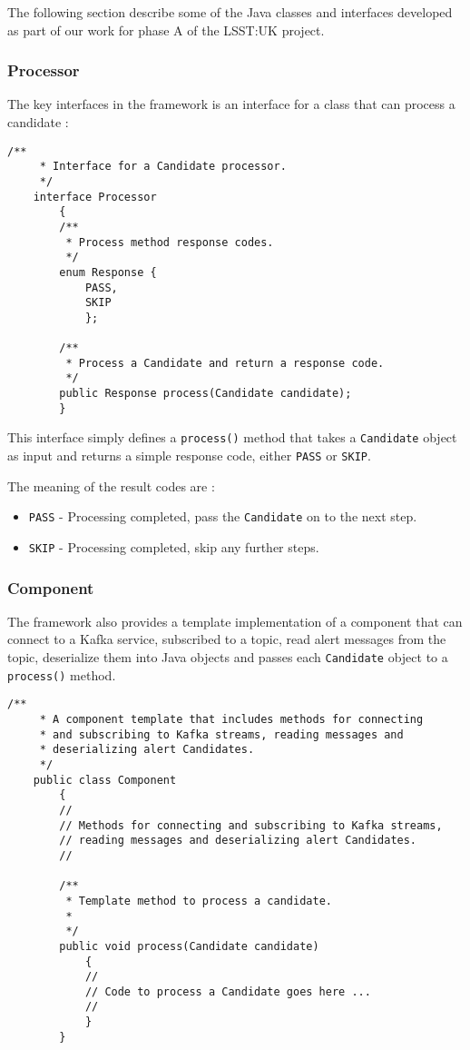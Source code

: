 \documentclass{article}
\newcommand{\deserz}    {deserialize\xspace}
\newcommand{\phasea} {phase A\xspace}
\newcommand{\lsstuk} {LSST:UK\xspace}
\begin{document}
The following section describe some of the Java classes and interfaces developed as part of our work for \phasea of the \lsstuk project. 

\subsubsection{Processor}
\label{java-interfaces.Processor}

The key interfaces in the framework is an interface for a class that can process a candidate :

\begin{lstlisting}[style=Java]
    /**
     * Interface for a Candidate processor.
     */
    interface Processor
        {
        /**
         * Process method response codes.
         */
        enum Response {
            PASS,
            SKIP
            };

        /**
         * Process a Candidate and return a response code.
         */
        public Response process(Candidate candidate);
        }
\end{lstlisting}

This interface simply defines a \texttt{process()} method that takes a \texttt{Candidate} object as input and
returns a simple response code, either \texttt{PASS} or \texttt{SKIP}.

The meaning of the result codes are :
\begin{itemize}
  \item \texttt{PASS} - Processing completed, pass the \texttt{Candidate} on to the next step.
  \item \texttt{SKIP} - Processing completed, skip any further steps.
\end{itemize}

\subsubsection{Component}
\label{java-interfaces.Component}

The framework also provides a template implementation of a component that can connect to a Kafka service, subscribed to a topic, read alert messages from the topic, \deserz them into Java objects and passes each \texttt{Candidate} object to a \texttt{process()} method.

\begin{lstlisting}[style=Java]
    /**
     * A component template that includes methods for connecting
     * and subscribing to Kafka streams, reading messages and
     * deserializing alert Candidates.
     */
    public class Component
        {
        //
        // Methods for connecting and subscribing to Kafka streams,
        // reading messages and deserializing alert Candidates.
        //

        /**
         * Template method to process a candidate.
         *
         */
        public void process(Candidate candidate)
            {
            //
            // Code to process a Candidate goes here ...
            //
            }
        }
\end{lstlisting}
\end{document}
